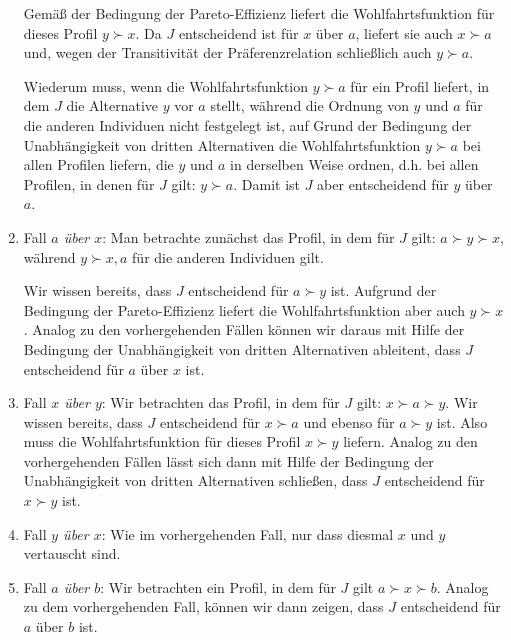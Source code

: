 \begin{enumerate}
  Gemäß der Bedingung der Pareto-Effizienz liefert die Wohlfahrtsfunktion für
  dieses Profil $y \succ x$. Da $J$ entscheidend ist für $x$ über $a$, liefert
  sie auch $x \succ a$ und, wegen der Transitivität der Präferenzrelation
  schließlich auch $y \succ a$. 
 
  Wiederum muss, wenn die Wohlfahrtsfunktion $y \succ a$ für ein Profil liefert,
  in dem $J$ die Alternative $y$ vor $a$ stellt, während die Ordnung von $y$ und $a$
  für die anderen Individuen nicht festgelegt ist, auf Grund der
  Bedingung der Unabhängigkeit von dritten Alternativen die
  Wohlfahrtsfunktion $y \succ a$ bei allen Profilen liefern, die $y$ und $a$ in
  derselben Weise ordnen, d.h. bei allen Profilen, in denen für $J$ gilt: $y
  \succ a$. Damit ist $J$ aber entscheidend für $y$ über $a$.

  \item Fall {\em $a$ über $x$}: Man betrachte zunächst das Profil, in dem für
  $J$ gilt: $a \succ y \succ x$, während $y \succ x,a$ für die anderen
  Individuen gilt. 
  
  Wir wissen bereits, dass $J$ entscheidend für $a \succ y$ ist. Aufgrund der
  Bedingung der Pareto-Effizienz liefert die Wohlfahrtsfunktion aber auch $y
  \succ x$. Analog zu den vorhergehenden Fällen können wir daraus mit Hilfe
  der Bedingung der Unabhängigkeit von dritten Alternativen ableitent,
  dass $J$ entscheidend für $a$ über $x$ ist.
  
  \item Fall {\em $x$ über $y$}: Wir betrachten das Profil, in dem für $J$ gilt:
  $x \succ a \succ y$. Wir wissen bereits, dass $J$ entscheidend für $x \succ a$
  und ebenso für $a \succ y$ ist. Also muss die Wohlfahrtsfunktion für dieses
  Profil $x \succ y$ liefern. Analog zu den vorhergehenden Fällen lässt sich
  dann mit Hilfe der Bedingung der Unabhängigkeit von dritten Alternativen
  schließen, dass $J$ entscheidend für $x \succ y$ ist.

  \item Fall {\em $y$ über $x$}: Wie im vorhergehenden Fall, nur dass
  diesmal $x$ und $y$ vertauscht sind.
  
  \item Fall {\em $a$ über $b$}: Wir betrachten ein Profil, in dem für $J$ gilt
  $a \succ x \succ b$. Analog zu dem vorhergehenden Fall, können wir dann
  zeigen, dass $J$ entscheidend für $a$ über $b$ ist.

\end{enumerate}

